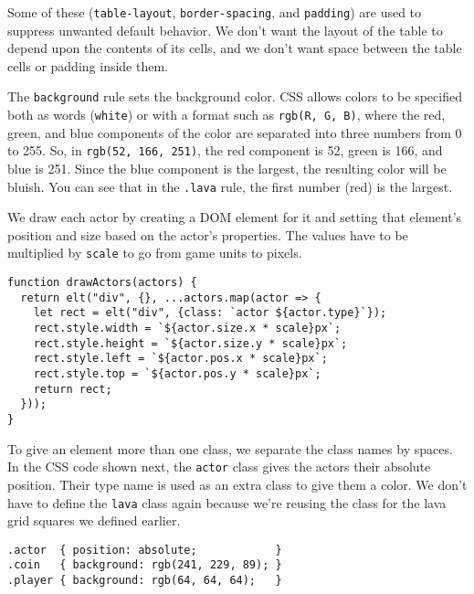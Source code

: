 Some of these (\lstinline`table-layout`, \lstinline`border-spacing`, and \lstinline`padding`) are used to suppress unwanted default behavior. We don't want the layout of the table to depend upon the contents of its cells, and we don't want space between the table cells or padding inside them.

The \lstinline`background` rule sets the background color. CSS allows colors to be specified both as words (\lstinline`white`) or with a format such as \lstinline`rgb(R, G, B)`, where the red, green, and blue components of the color are separated into three numbers from 0 to 255. So, in \lstinline`rgb(52, 166, 251)`, the red component is 52, green is 166, and blue is 251. Since the blue component is the largest, the resulting color will be bluish. You can see that in the \lstinline`.lava` rule, the first number (red) is the largest.

We draw each actor by creating a DOM element for it and setting that element's position and size based on the actor's properties. The values have to be multiplied by \lstinline`scale` to go from game units to pixels.

\begin{lstlisting}
function drawActors(actors) {
  return elt("div", {}, ...actors.map(actor => {
    let rect = elt("div", {class: `actor ${actor.type}`});
    rect.style.width = `${actor.size.x * scale}px`;
    rect.style.height = `${actor.size.y * scale}px`;
    rect.style.left = `${actor.pos.x * scale}px`;
    rect.style.top = `${actor.pos.y * scale}px`;
    return rect;
  }));
}
\end{lstlisting}
\noindent{}

To give an element more than one class, we separate the class names by spaces. In the CSS code shown next, the \lstinline`actor` class gives the actors their absolute position. Their type name is used as an extra class to give them a color. We don't have to define the \lstinline`lava` class again because we're reusing the class for the lava grid squares we defined earlier.

\begin{lstlisting}
.actor  { position: absolute;            }
.coin   { background: rgb(241, 229, 89); }
.player { background: rgb(64, 64, 64);   }
\end{lstlisting}
\noindent{}


